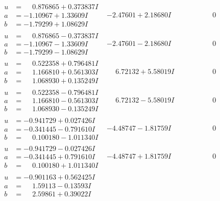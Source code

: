 \documentclass[1p]{elsarticle_modified}
\theoremstyle{definition}
\begin{document}
$$\begin{array}{c|c|c}
\begin{aligned}
u &= \phantom{-}0.876865 + 0.373837 I \\
a &= -1.10967 + 1.33609 I \\
b &= -1.79299 + 1.08629 I\end{aligned}
 & -2.47601 + 2.18680 I & \phantom{-0.000000 } 0 \\ \hline\begin{aligned}
u &= \phantom{-}0.876865 - 0.373837 I \\
a &= -1.10967 - 1.33609 I \\
b &= -1.79299 - 1.08629 I\end{aligned}
 & -2.47601 - 2.18680 I & \phantom{-0.000000 } 0 \\ \hline\begin{aligned}
u &= \phantom{-}0.522358 + 0.796481 I \\
a &= \phantom{-}1.166810 + 0.561303 I \\
b &= \phantom{-}1.068930 + 0.135249 I\end{aligned}
 & \phantom{-}6.72132 + 5.58019 I & \phantom{-0.000000 } 0 \\ \hline\begin{aligned}
u &= \phantom{-}0.522358 - 0.796481 I \\
a &= \phantom{-}1.166810 - 0.561303 I \\
b &= \phantom{-}1.068930 - 0.135249 I\end{aligned}
 & \phantom{-}6.72132 - 5.58019 I & \phantom{-0.000000 } 0 \\ \hline\begin{aligned}
u &= -0.941729 + 0.027426 I \\
a &= -0.341445 - 0.791610 I \\
b &= \phantom{-}0.100180 - 1.011340 I\end{aligned}
 & -4.48747 - 1.81759 I & \phantom{-0.000000 } 0 \\ \hline\begin{aligned}
u &= -0.941729 - 0.027426 I \\
a &= -0.341445 + 0.791610 I \\
b &= \phantom{-}0.100180 + 1.011340 I\end{aligned}
 & -4.48747 + 1.81759 I & \phantom{-0.000000 } 0 \\ \hline\begin{aligned}
u &= -0.901163 + 0.562425 I \\
a &= \phantom{-}1.59113 - 0.13593 I \\
b &= \phantom{-}2.59861 + 0.39022 I\end{aligned}

\end{array}$$
\end{document}
